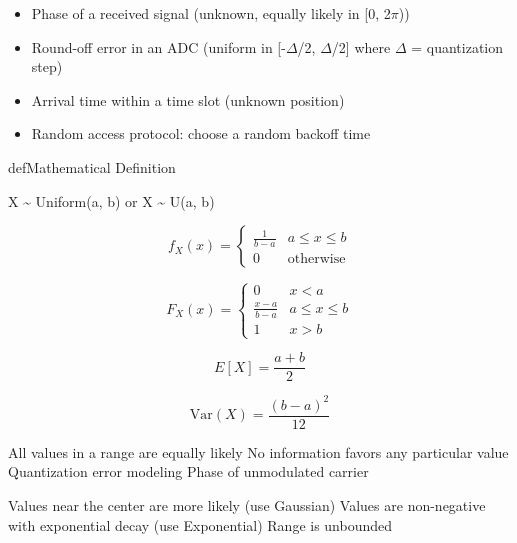 
\begin{itemize}
\tightlist
\item
  Phase of a received signal (unknown, equally likely in [0, 2\ensuremath{\pi}))
\item
  Round-off error in an ADC (uniform in [-\ensuremath{\Delta}/2, \ensuremath{\Delta}/2] where \ensuremath{\Delta} = quantization step)
\item
  Arrival time within a time slot (unknown position)
\item
  Random access protocol: choose a random backoff time
\end{itemize}

\begin{PSbox}[unbreakable]{def}{Mathematical Definition}

X \textasciitilde{} Uniform(a, b) or X \textasciitilde{} U(a, b)

\end{PSbox}


\[f_X(x) = \begin{cases} \frac{1}{b-a} & a \leq x \leq b \\ 0 & \text{otherwise} \end{cases}\]


\[F_X(x) = \begin{cases} 0 & x < a \\ \frac{x-a}{b-a} & a \leq x \leq b \\ 1 & x > b \end{cases}\]


\[E[X] = \frac{a+b}{2}\]


\[\text{Var}(X) = \frac{(b-a)^2}{12}\]


\PSyes{} All values in a range are equally likely\PSbr{}\PSyes{} No information favors any particular value\PSbr{}\PSyes{} Quantization error modeling\PSbr{}\PSyes{} Phase of unmodulated carrier


\PSno{} Values near the center are more likely (use Gaussian)\PSbr{}\PSno{} Values are non-negative with exponential decay (use Exponential)\PSbr{}\PSno{} Range is unbounded

